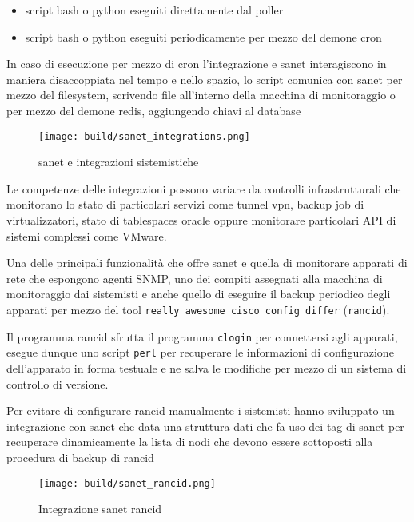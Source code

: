 \begin{itemize}
  \item{script bash o python eseguiti direttamente dal poller}
  \item{script bash o python eseguiti periodicamente per mezzo del demone cron}
\end{itemize}

In caso di esecuzione per mezzo di cron l'integrazione e sanet interagiscono in maniera disaccoppiata nel tempo e nello spazio, lo script comunica con sanet per mezzo del filesystem, scrivendo file all'interno della macchina di monitoraggio o per mezzo del demone redis, aggiungendo chiavi al database

\begin{figure}[H]
    \centering
    \texttt{[image: build/sanet\_integrations.png]}
    \caption{sanet e integrazioni sistemistiche}
    \label{fig:enter-label}
\end{figure}

Le competenze delle integrazioni possono variare da controlli infrastrutturali che monitorano lo stato di particolari servizi come tunnel vpn, backup job di virtualizzatori, stato di tablespaces oracle oppure monitorare particolari API di sistemi complessi come VMware.

Una delle principali funzionalità che offre sanet e quella di monitorare apparati di rete che espongono agenti SNMP, uno dei compiti assegnati alla macchina di monitoraggio dai sistemisti e anche quello di eseguire il backup periodico degli apparati per mezzo del tool \verb|really awesome cisco config differ| (\verb|rancid|).

Il programma rancid sfrutta il programma \verb|clogin| per connettersi agli apparati, esegue dunque uno script \verb|perl| per recuperare le informazioni di configurazione dell'apparato in forma testuale e ne salva le modifiche per mezzo di un sistema di controllo di versione.

Per evitare di configurare rancid manualmente i sistemisti hanno sviluppato un integrazione con sanet che data una struttura dati che fa uso dei tag di sanet per recuperare dinamicamente la lista di nodi che devono essere sottoposti alla procedura di backup di rancid

\begin{figure}[H]
    \centering
    \texttt{[image: build/sanet\_rancid.png]}
    \caption{Integrazione sanet rancid}
    \label{fig:enter-label}
\end{figure}


